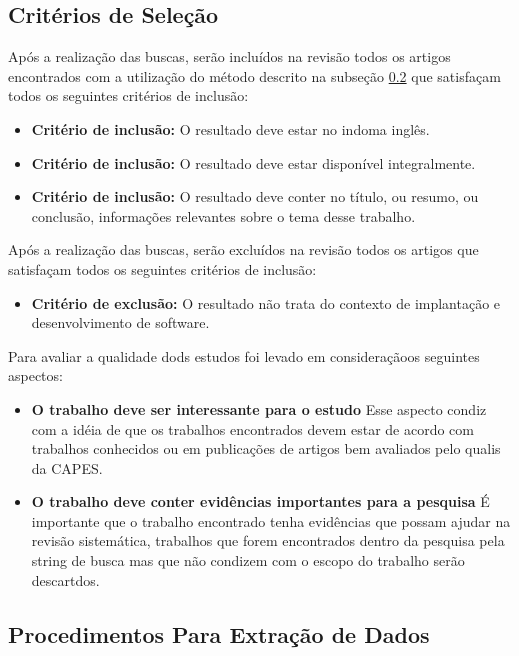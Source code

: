 \documentclass[12pt]{article}
\begin{document}
\subsection{Critérios de Seleção} \label{sec3:subsec4}

Após a realização das buscas, serão incluídos na revisão todos os artigos encontrados com a utilização do método descrito na subseção \ref{sec3:subsec5} que satisfaçam todos os seguintes critérios de inclusão:

 \begin{itemize}
   \item  \textbf{Critério de inclusão:} O resultado deve estar no indoma inglês.
   \item  \textbf{Critério de inclusão:} O resultado deve estar disponível integralmente.
   \item  \textbf{Critério de inclusão:} O resultado deve conter no título, ou resumo, ou conclusão,  informações relevantes sobre o tema desse trabalho.
 \end{itemize}

 Após a realização das buscas, serão excluídos na revisão todos os artigos que satisfaçam todos os seguintes critérios de inclusão:

 \begin{itemize}
   \item  \textbf{Critério de exclusão:} O resultado não trata do contexto de implantação e desenvolvimento de software.
 \end{itemize}

Para avaliar a qualidade dods estudos foi levado em consideraçãoos seguintes aspectos:

 \begin{itemize}
   \item  \textbf{O trabalho deve ser interessante para o estudo} Esse aspecto condiz com a idéia de que os trabalhos encontrados devem estar de acordo com trabalhos conhecidos ou em publicações de artigos bem avaliados pelo qualis da CAPES.
   \item  \textbf{O trabalho deve conter evidências importantes para a pesquisa} É importante que o trabalho encontrado tenha evidências que possam ajudar na revisão sistemática, trabalhos que forem encontrados dentro da pesquisa pela string de busca mas que não condizem com o escopo do trabalho serão descartdos.
 \end{itemize}

\subsection{Procedimentos Para Extração de Dados} \label{sec3:subsec5}
\end{document}
